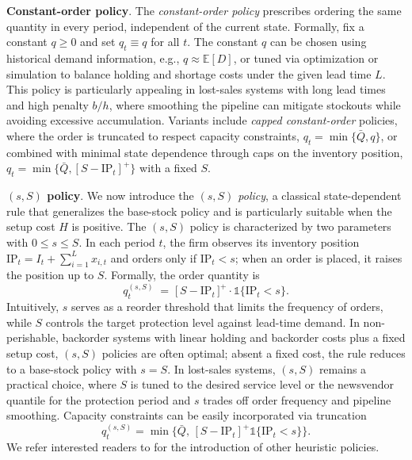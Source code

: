 \noindent\textbf{Constant-order policy}. The \textit{constant-order policy} prescribes ordering the same quantity in every period, independent of the current state. Formally, fix a constant $q \ge 0$ and set $q_t \equiv q$ for all $t$. The constant $q$ can be chosen using historical demand information, e.g., $q \approx \mathds{E}[D]$, or tuned via optimization or simulation to balance holding and shortage costs under the given lead time $L$. This policy is particularly appealing in lost-sales systems with long lead times and high penalty $b/h$, where smoothing the pipeline can mitigate stockouts while avoiding excessive accumulation. Variants include \textit{capped constant-order} policies, where the order is truncated to respect capacity constraints, $q_t = \min\{\bar{Q}, q\}$, or combined with minimal state dependence through caps on the inventory position, $q_t = \min\{\bar{Q}, [S - \mathrm{IP}_t]^+\}$ with a fixed $S$.

\noindent\textbf{$(s, S)$ policy}.
We now introduce the \textit{$(s, S)$ policy}, a classical state-dependent rule that generalizes the base-stock policy and is particularly suitable when the setup cost $H$ is positive. The $(s, S)$ policy is characterized by two parameters with $0 \le s \le S$. In each period $t$, the firm observes its inventory position $\mathrm{IP}_t = I_t + \sum_{i=1}^L x_{i,t}$ and orders only if $\mathrm{IP}_t < s$; when an order is placed, it raises the position up to $S$. Formally, the order quantity is
\[
q_t^{(s,S)} \;=\; \big[\, S - \mathrm{IP}_t \,\big]^+ \cdot \mathds{1}\{\mathrm{IP}_t < s\}.
\]
Intuitively, $s$ serves as a reorder threshold that limits the frequency of orders, while $S$ controls the target protection level against lead-time demand. In non-perishable, backorder systems with linear holding and backorder costs plus a fixed setup cost, $(s, S)$ policies are often optimal; absent a fixed cost, the rule reduces to a base-stock policy with $s = S$. In lost-sales systems, $(s, S)$ remains a practical choice, where $S$ is tuned to the desired service level or the newsvendor quantile for the protection period and $s$ trades off order frequency and pipeline smoothing. Capacity constraints can be easily incorporated via truncation 
\[
q_t^{(s,S)} = \min\{\bar{Q}, \, [S - \mathrm{IP}_t]^+ \mathds{1}\{\mathrm{IP}_t < s\}\}.
\]
We refer interested readers to \cite{simchi2005logic} for the introduction of other heuristic policies.
